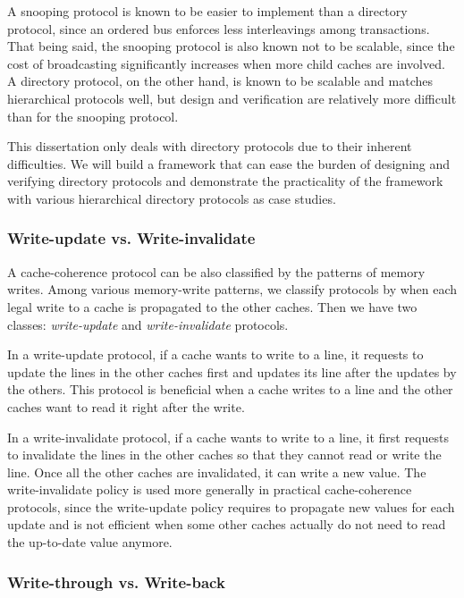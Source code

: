 A snooping protocol is known to be easier to implement than a directory protocol, since an ordered bus enforces less interleavings among transactions.
That being said, the snooping protocol is also known not to be scalable, since the cost of broadcasting significantly increases when more child caches are involved.
A directory protocol, on the other hand, is known to be scalable and matches hierarchical protocols well, but design and verification are relatively more difficult than for the snooping protocol.

This dissertation only deals with directory protocols due to their inherent difficulties.
We will build a framework that can ease the burden of designing and verifying directory protocols and demonstrate the practicality of the framework with various hierarchical directory protocols as case studies.

\subsubsection{Write-update vs. Write-invalidate}

A cache-coherence protocol can be also classified by the patterns of memory writes.
Among various memory-write patterns, we classify protocols by when each legal write to a cache is propagated to the other caches.
Then we have two classes: \emph{write-update} and \emph{write-invalidate} protocols.

In a write-update protocol, if a cache wants to write to a line, it requests to update the lines in the other caches first and updates its line after the updates by the others.
This protocol is beneficial when a cache writes to a line and the other caches want to read it right after the write.

In a write-invalidate protocol, if a cache wants to write to a line, it first requests to invalidate the lines in the other caches so that they cannot read or write the line.
Once all the other caches are invalidated, it can write a new value.
The write-invalidate policy is used more generally in practical cache-coherence protocols, since the write-update policy requires to propagate new values for each update and is not efficient when some other caches actually do not need to read the up-to-date value anymore.

\subsubsection{Write-through vs. Write-back}

